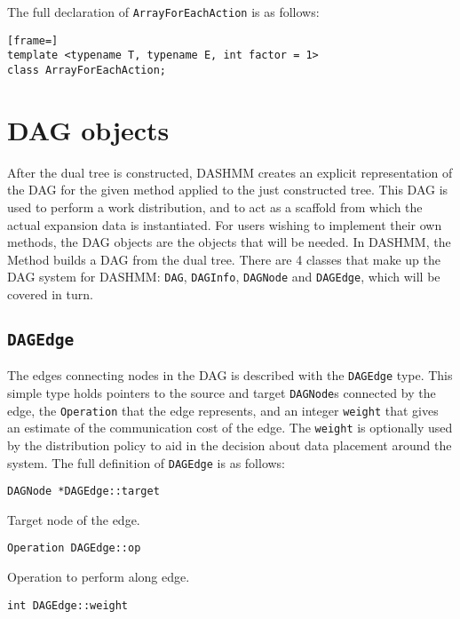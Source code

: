 The full declaration of \texttt{ArrayForEachAction} is as follows:

\begin{lstlisting}[frame=]
template <typename T, typename E, int factor = 1>
class ArrayForEachAction;
\end{lstlisting}



\section{DAG objects}

After the dual tree is constructed, DASHMM creates an explicit representation
of the DAG for the given method applied to the just constructed tree. This DAG
is used to perform a work distribution, and to act as a scaffold from which
the actual expansion data is instantiated. For users wishing to implement
their own methods, the DAG objects are the objects that will be needed. In
DASHMM, the Method builds a DAG from the dual tree. There are 4 classes that
make up the DAG system for DASHMM: \texttt{DAG}, \texttt{DAGInfo},
\texttt{DAGNode} and \texttt{DAGEdge}, which will be covered in turn.

\subsection{\texttt{DAGEdge}}

The edges connecting nodes in the DAG is described with the \texttt{DAGEdge}
type. This simple type holds pointers to the source and target
\texttt{DAGNode}s connected by the edge, the \texttt{Operation} that the edge
represents, and an integer \texttt{weight} that gives an estimate of the
communication cost of the edge. The \texttt{weight} is optionally used by the
distribution policy to aid in the decision about data placement around the
system. The full definition of \texttt{DAGEdge} is as follows:

\begin{lstlisting}
DAGNode *DAGEdge::target
\end{lstlisting}

\noindent Target node of the edge.

\begin{lstlisting}
Operation DAGEdge::op
\end{lstlisting}

\noindent Operation to perform along edge.

\begin{lstlisting}
int DAGEdge::weight
\end{lstlisting}


